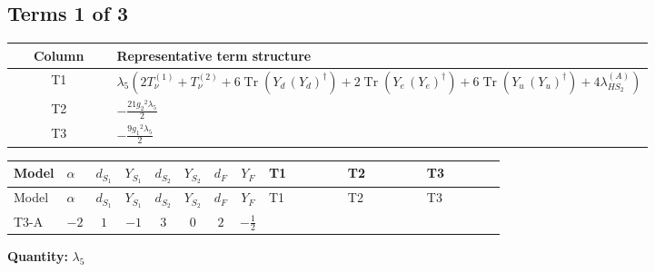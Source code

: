 \documentclass[8pt]{article}
\begin{document}
\begin{landscape}
\subsection*{Terms 1 of 3}
\begin{center}
\begin{tabular}{@{}c >{\raggedright\arraybackslash}p{0.82\linewidth}@{}}
\toprule
Column & Representative term structure \\
\midrule
T1 & \(\displaystyle {\lambda_5} (2 T_{\nu}^{(1)}+T_{\nu}^{(2)}+6 \operatorname{Tr}\!\left({Y_d}\,\left({Y_d}\right)^{\dagger}\right)+2 \operatorname{Tr}\!\left({Y_e}\,\left({Y_e}\right)^{\dagger}\right)+6 \operatorname{Tr}\!\left({Y_u}\,\left({Y_u}\right)^{\dagger}\right)+4 {\lambda_{HS_2}^{(A)}})\) \\
\midrule
T2 & \(\displaystyle -\frac{21 {g_2}^2 {\lambda_5}}{2}\) \\
\midrule
T3 & \(\displaystyle -\frac{9 {g_1}^2 {\lambda_5}}{2}\) \\
\midrule
\bottomrule
\end{tabular}
\end{center}
\smallskip
\tiny
\begin{longtable}{@{}llcccccc >{\raggedright\arraybackslash}p{0.21\linewidth} >{\raggedright\arraybackslash}p{0.21\linewidth} >{\raggedright\arraybackslash}p{0.21\linewidth}@{}}
\toprule
Model & $\alpha$ & $d_{S_1}$ & $Y_{S_1}$ & $d_{S_2}$ & $Y_{S_2}$ & $d_F$ & $Y_F$ & T1 & T2 & T3 \\
\midrule
\endfirsthead
\toprule
Model & $\alpha$ & $d_{S_1}$ & $Y_{S_1}$ & $d_{S_2}$ & $Y_{S_2}$ & $d_F$ & $Y_F$ & T1 & T2 & T3 \\
\midrule
\endhead
T3-A & $-2$ & $1$ & $-1$ & $3$ & $0$ & $2$ & $-\frac{1}{2}$ & \scriptsize\adjustbox{max width=\linewidth}{$\begin{gathered} {\lambda_5} (2 T_{\nu}^{(1)}+T_{\nu}^{(2)}+6 \operatorname{Tr}\!\left({Y_d}\,\left({Y_d}\right)^{\dagger}\right)+2 \operatorname{Tr}\!\left({Y_e}\,\left({Y_e}\right)^{\dagger}\right)+6 \operatorname{Tr}\!\left({Y_u}\,\left({Y_u}\right)^{\dagger}\right)+4 {\lambda_{HS_2}^{(A)}})\end{gathered}$} & \scriptsize\adjustbox{max width=\linewidth}{$\begin{gathered} -\frac{21 {g_2}^2 {\lambda_5}}{2}\end{gathered}$} & \scriptsize\adjustbox{max width=\linewidth}{$\begin{gathered} -\frac{9 {g_1}^2 {\lambda_5}}{2}\end{gathered}$} \\
\midrule
\bottomrule
\end{longtable}
\clearpage
\noindent\textbf{Quantity: }$\lambda_5$\par\smallskip

\end{landscape}
\end{document}
